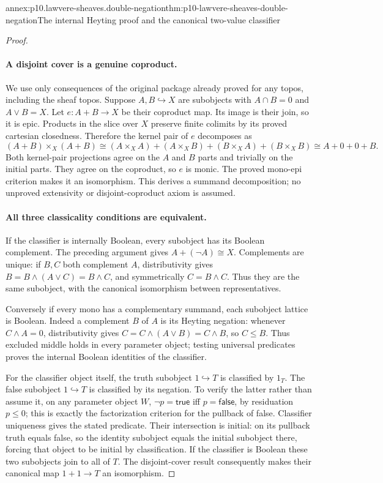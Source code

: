\begin{annexitem}{annex:p10.lawvere-sheaves.double-negation}{thm:p10-lawvere-sheaves-double-negation}{The internal Heyting proof and the canonical two-value classifier}
\begin{proof}
\paragraph{A disjoint cover is a genuine coproduct.}
We use only consequences of the original package already
proved for any topos, including the sheaf topos.  Suppose
\(A,B\hookrightarrow X\) are subobjects with
\(A\cap B=0\) and \(A\lor B=X\).
Let \(e:A+B\to X\) be their coproduct map.
Its image is their join, so it is epic.
Products in the slice over \(X\) preserve finite
colimits by its proved cartesian closedness.  Therefore
the kernel pair of \(e\) decomposes as
\[
 (A+B)\times_X(A+B)
 \cong(A\times_XA)+(A\times_XB)
        +(B\times_XA)+(B\times_XB)
 \cong A+0+0+B.
\]
Both kernel-pair projections agree on the \(A\) and
\(B\) parts and trivially on the initial parts.
They agree on the coproduct, so \(e\) is monic.
The proved mono-epi criterion makes it an isomorphism.
This derives a summand decomposition; no unproved
extensivity or disjoint-coproduct axiom is assumed.

\paragraph{All three classicality conditions are equivalent.}
If the classifier is internally Boolean, every subobject
has its Boolean complement.  The preceding argument gives
\(A+(\neg A)\cong X\).  Complements are unique:
if \(B,C\) both complement \(A\), distributivity gives
\(B=B\land(A\lor C)=B\land C\), and symmetrically
\(C=B\land C\).  Thus they are the same subobject,
with the canonical isomorphism between representatives.

Conversely if every mono has a complementary summand,
each subobject lattice is Boolean.  Indeed a complement
\(B\) of \(A\) is its Heyting negation: whenever
\(C\land A=0\), distributivity gives
\(C=C\land(A\lor B)=C\land B\), so \(C\leq B\).
Thus excluded middle holds in every parameter object;
testing universal predicates proves the internal Boolean
identities of the classifier.

For the classifier object itself, the truth subobject
\(1\hookrightarrow T\) is classified by \(1_T\).
The false subobject \(1\hookrightarrow T\) is
classified by its negation.  To verify the latter rather
than assume it, on any parameter object \(W\),
\(\neg p=\mathsf{true}\) iff \(p=\mathsf{false}\),
by residuation \(p\leq0\); this is exactly the
factorization criterion for the pullback of false.
Classifier uniqueness gives the stated predicate.
Their intersection is initial: on its pullback truth
equals false, so the identity subobject equals the
initial subobject there, forcing that object to be
initial by classification.  If the classifier is
Boolean these two subobjects join to all of \(T\).
The disjoint-cover result consequently makes their
canonical map \(1+1\to T\) an isomorphism.


\end{proof}
\end{annexitem}
